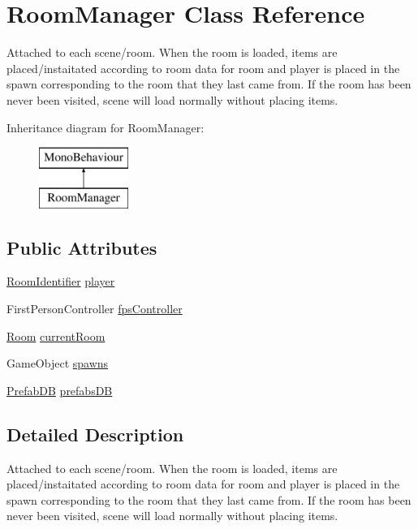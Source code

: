 \hypertarget{class_room_manager}{}\section{Room\+Manager Class Reference}
\label{class_room_manager}


Attached to each scene/room. When the room is loaded, items are placed/instaitated according to room data for room and player is placed in the spawn corresponding to the room that they last came from. If the room has been never been visited, scene will load normally without placing items.  


Inheritance diagram for Room\+Manager\+:\begin{figure}[H]
\begin{center}
\leavevmode
\includegraphics[height=2.000000cm]{class_room_manager}
\end{center}
\end{figure}
\subsection*{Public Attributes}
\begin{DoxyCompactItemize}
\item 
\hyperlink{class_room_identifier}{Room\+Identifier} \hyperlink{class_room_manager_ac3bbfcfdd6a9ae2f1b64f2866e38cc56}{player}
\item 
First\+Person\+Controller \hyperlink{class_room_manager_a130b5be149bcad3ae589e79950e24a5e}{fps\+Controller}
\item 
\hyperlink{_load_room_8cs_a487e93cb0c81b7ae3c65d743fde387c0}{Room} \hyperlink{class_room_manager_acfaaa02bb245fe496ad676e2e4a454bd}{current\+Room}
\item 
Game\+Object \hyperlink{class_room_manager_ac1df5a2a6481d53628256ad04523f123}{spawns}
\item 
\hyperlink{class_prefab_d_b}{Prefab\+DB} \hyperlink{class_room_manager_ace74869893d9f0223193af8a4e766e1b}{prefabs\+DB}
\end{DoxyCompactItemize}


\subsection{Detailed Description}
Attached to each scene/room. When the room is loaded, items are placed/instaitated according to room data for room and player is placed in the spawn corresponding to the room that they last came from. If the room has been never been visited, scene will load normally without placing items. 



